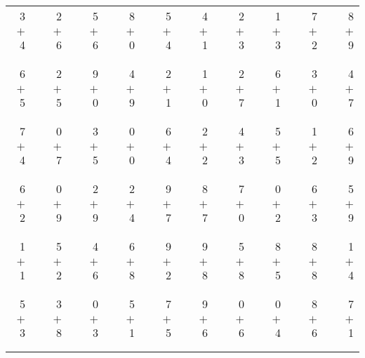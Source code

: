 \documentclass[12pt, letterpaper]{article}
\begin{document}
\begin{tabular}{rrrrrrrrrrrrrrrrrrr}
3 & & 2 & & 5 & & 8 & & 5 & & 4 & & 2 & & 1 & & 7 & & 8\\
$+$ 4 & & $+$ 6 & & $+$ 6 & & $+$ 0 & & $+$ 4 & & $+$ 1 & & $+$ 3 & & $+$ 3 & & $+$ 2 & & $+$ 9\\
\cline{1-1} \cline{3-3} \cline{5-5} \cline{7-7} \cline{9-9} \cline{11-11} \cline{13-13} \cline{15-15} \cline{17-17} \cline{19-19} \\ \\
6 & & 2 & & 9 & & 4 & & 2 & & 1 & & 2 & & 6 & & 3 & & 4\\
$+$ 5 & & $+$ 5 & & $+$ 0 & & $+$ 9 & & $+$ 1 & & $+$ 0 & & $+$ 7 & & $+$ 1 & & $+$ 0 & & $+$ 7\\
\cline{1-1} \cline{3-3} \cline{5-5} \cline{7-7} \cline{9-9} \cline{11-11} \cline{13-13} \cline{15-15} \cline{17-17} \cline{19-19} \\ \\
7 & & 0 & & 3 & & 0 & & 6 & & 2 & & 4 & & 5 & & 1 & & 6\\
$+$ 4 & & $+$ 7 & & $+$ 5 & & $+$ 0 & & $+$ 4 & & $+$ 2 & & $+$ 3 & & $+$ 5 & & $+$ 2 & & $+$ 9\\
\cline{1-1} \cline{3-3} \cline{5-5} \cline{7-7} \cline{9-9} \cline{11-11} \cline{13-13} \cline{15-15} \cline{17-17} \cline{19-19} \\ \\
6 & & 0 & & 2 & & 2 & & 9 & & 8 & & 7 & & 0 & & 6 & & 5\\
$+$ 2 & & $+$ 9 & & $+$ 9 & & $+$ 4 & & $+$ 7 & & $+$ 7 & & $+$ 0 & & $+$ 2 & & $+$ 3 & & $+$ 9\\
\cline{1-1} \cline{3-3} \cline{5-5} \cline{7-7} \cline{9-9} \cline{11-11} \cline{13-13} \cline{15-15} \cline{17-17} \cline{19-19} \\ \\
1 & & 5 & & 4 & & 6 & & 9 & & 9 & & 5 & & 8 & & 8 & & 1\\
$+$ 1 & & $+$ 2 & & $+$ 6 & & $+$ 8 & & $+$ 2 & & $+$ 8 & & $+$ 8 & & $+$ 5 & & $+$ 8 & & $+$ 4\\
\cline{1-1} \cline{3-3} \cline{5-5} \cline{7-7} \cline{9-9} \cline{11-11} \cline{13-13} \cline{15-15} \cline{17-17} \cline{19-19} \\ \\
5 & & 3 & & 0 & & 5 & & 7 & & 9 & & 0 & & 0 & & 8 & & 7\\
$+$ 3 & & $+$ 8 & & $+$ 3 & & $+$ 1 & & $+$ 5 & & $+$ 6 & & $+$ 6 & & $+$ 4 & & $+$ 6 & & $+$ 1\\
\cline{1-1} \cline{3-3} \cline{5-5} \cline{7-7} \cline{9-9} \cline{11-11} \cline{13-13} \cline{15-15} \cline{17-17} \cline{19-19} \\ \\

\end{tabular}
\end{document}
